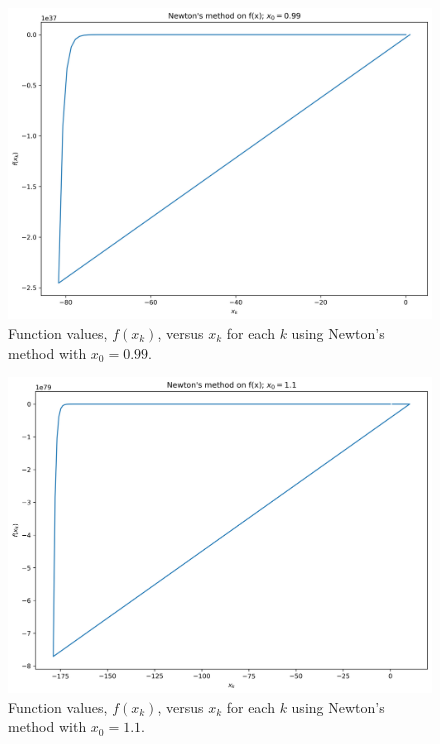 \documentclass[11pt]{article}
\begin{document}
\begin{figure}[H]
	\centering
	\includegraphics[width=\linewidth]{../figures/Newtons_f_0.99}
	\caption{Function values, $f(x_k)$, versus $x_k$ for each $k$ using Newton's method with $x_0 = 0.99$.}
	\label{fig:newton_f_0.99}
\end{figure}

\begin{figure}[H]
	\centering
	\includegraphics[width=\linewidth]{../figures/Newtons_f_1.1}
	\caption{Function values, $f(x_k)$, versus $x_k$ for each $k$ using Newton's method with $x_0 = 1.1$.}
	\label{fig:newton_f_1.1}
\end{figure}
\end{document}
